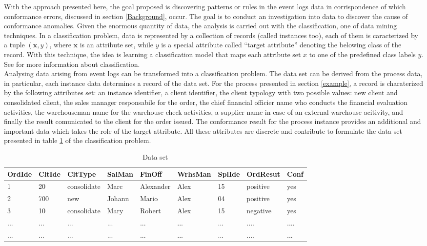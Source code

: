 \documentclass[11pt]{article}
\begin{document}
With the approach presented here, the goal proposed is discovering patterns or rules in the event logs data in corrispondence of which conformance errors, discussed in section \ref{Background}, occur. The goal is to conduct an investigation into data to discover the cause of conformance anomalies. Given the enormous quantity of data, the analysis is carried out with the classification, one of data mining techniques. In a classification problem, data is represented by a collection of records (called instances too), each of them is caracterized by a tuple $(\mathbf{x},y)$, where $\mathbf{x}$ is an attribute set, while $y$ is a special attribute called ``target attribute'' denoting the belowing class of the record. With this technique, the idea is learning a classification model that maps each attribute set $x$ to one of the predefined class labels $y$. See \cite{} for more information about classification.\\

Analysing data arising from event logs can be transformed into a classification problem. The data set can be derived from the process data, in particular, each instance data determines a record of the data set. For the process presented in section \ref{example}, a record is charaterized by the following attributes set: an instance identifier, a client identifier, the client typology with two possible values: new client and consolidated client, the sales manager responsabile for the order, the chief financial officier name who conducts the financial evaluation activities, the warehouseman name for the warehouse check activities, a supplier name in case of an external warehouse acitivity, and finally the result comunicated to the client for the order issued. The conformance result for the process instance provides an additional and important data which takes the role of the target attribute. All these attributes are discrete and contribute to formulate the data set presented in table \ref{tab:SaleData} of the classification problem.\\

\begin{table}[!h]
\scriptsize
\centering
\begin{tabular}{|p{}|p{}|p{}|p{}|p{}|p{}|p{0.8cm}|p{}|p{}|}
\hline OrdIde & CltIde & CltType & SalMan & FinOff & WrhsMan & SplIde & OrdResut & Conf\\
\hline
1 & 20 & consolidate & Marc & Alexander & Alex & 15 & positive & yes\\
\hline
2 & 700 & new & Johann & Mario & Alex & 04 & positive & yes\\
\hline
3 & 10 &consolidate & Mary & Robert & Alex & 15 & negative & yes\\
\hline
... & ... & ... & ... & ... & ... & ... & .... & .... \\
\hline
... & ... & ... & ... & ... & ... & ... & .... & ...  \\
\hline
\end{tabular}
\scriptsize
\caption{Data set}
\label{tab:SaleData}
\end{table}
\normalsize
\end{document}
